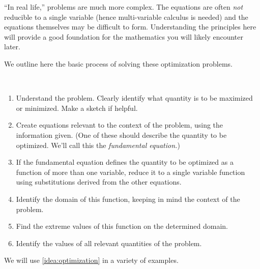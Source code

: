 ``In real life,'' problems are much more complex. The equations are often \textit{not} reducible to a single variable (hence multi-variable calculus is needed) and the equations themselves may be difficult to form. Understanding the principles here will provide a good foundation for the mathematics you will likely encounter later.

We outline here the basic process of solving these optimization problems.
{}
{~\\[-\baselineskip]
\begin{enumerate}
	\item	Understand the problem. Clearly identify what quantity is to be maximized or minimized. Make a sketch if helpful.
	\item	Create equations relevant to the context of the problem, using the information given. (One of these should describe the quantity to be optimized. We'll call this the \textit{fundamental equation.})
	\item	If the fundamental equation defines the quantity to be optimized as a function of more than one variable, reduce it to a single variable function using substitutions derived from the other equations.
%
	\item	Identify the domain of this function, keeping in mind the context of the problem.
	\item	Find the extreme values of this function on the determined domain.
	\item	Identify the values of all relevant quantities of the problem.
\end{enumerate}}

We will use \autoref{idea:optimization} in a variety of examples.

